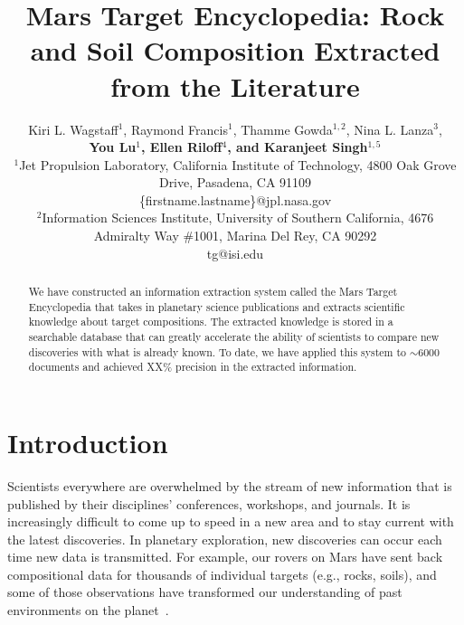 \documentclass[letterpaper]{article} %
\begin{document}
%
\title{Mars Target Encyclopedia: Rock and Soil Composition Extracted
from the Literature}
\author{
Kiri L. Wagstaff$^1$,
Raymond Francis$^1$,
Thamme Gowda$^{1,2}$,
Nina L. Lanza$^3$,\\
{\Large \bf You Lu$^1$,
Ellen Riloff$^4$, and
Karanjeet Singh$^{1,5}$}\\
$^1$Jet Propulsion Laboratory, California Institute of Technology,
4800 Oak Grove Drive, Pasadena, CA 91109\\
\{firstname.lastname\}@jpl.nasa.gov\\
$^2$Information Sciences Institute, University of Southern
California,
4676 Admiralty Way \#1001, Marina Del Rey, CA 90292\\
tg@isi.edu
}
\maketitle
\begin{abstract}
We have constructed an information extraction system called the Mars
Target Encyclopedia that takes in planetary science publications
and extracts scientific knowledge about target compositions.
The extracted knowledge is stored in a searchable database that can
greatly accelerate the ability of scientists to compare new
discoveries with what is already known.  To date, we have applied this
system to $\sim$6000 documents and achieved XX\% precision in the
extracted information.  
\end{abstract}

\section{Introduction}

Scientists everywhere are overwhelmed by the stream of new information
that is published by their disciplines' conferences, workshops, and
journals.  It is increasingly difficult to come up to speed in a
new area and to stay current with the latest discoveries.  In
planetary exploration, new discoveries can occur each time
new data is transmitted.  For example, our rovers on Mars have sent
back compositional data for thousands of individual targets (e.g.,
rocks, soils), and some of those observations have transformed our
understanding of past environments on the
planet~\cite{grotzinger:ykb14}. 
\end{document}
